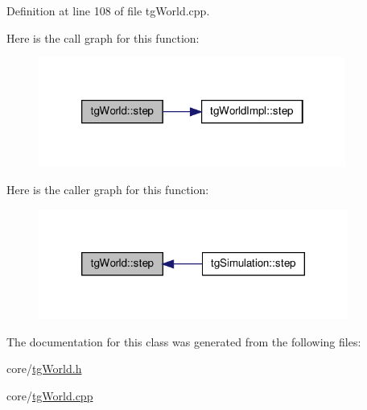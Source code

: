 Definition at line 108 of file tg\-World.\-cpp.



Here is the call graph for this function\-:\nopagebreak
\begin{figure}[H]
\begin{center}
\leavevmode
\includegraphics[width=286pt]{classtg_world_ac659156f5f0680451085b7cdb3ac1311_cgraph}
\end{center}
\end{figure}




Here is the caller graph for this function\-:\nopagebreak
\begin{figure}[H]
\begin{center}
\leavevmode
\includegraphics[width=288pt]{classtg_world_ac659156f5f0680451085b7cdb3ac1311_icgraph}
\end{center}
\end{figure}




The documentation for this class was generated from the following files\-:\begin{DoxyCompactItemize}
\item 
core/\hyperlink{tg_world_8h}{tg\-World.\-h}\item 
core/\hyperlink{tg_world_8cpp}{tg\-World.\-cpp}\end{DoxyCompactItemize}
